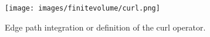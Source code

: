 \begin{figure}[ht]
\begin{center}
\texttt{[image: images/finitevolume/curl.png]}
\end{center}
\caption{Edge path integration or definition of the curl operator.}
\label{fig:finitevolume-curl}
\end{figure}
